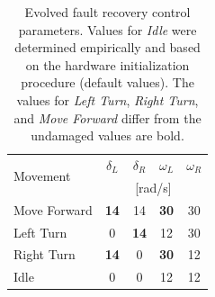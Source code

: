 \begin{table}
\centering
\renewcommand{\arraystretch}{1.7}
\begin{tabular}{l|cccc}
\hline
\multirow{2}{*}{Movement} & $\delta_L$ & $\delta_R$ & $\omega_L$ & $\omega_R$  \\
  & \multicolumn{4}{c}{[rad/s]}\\
\hline
\rowcolor{Gray}
Move Forward & \textbf{14} & 14 & \textbf{30} & 30 \\
Left Turn & 0 & \textbf{14} & 12 & 30 \\
\rowcolor{Gray}
Right Turn & \textbf{14} & 0 & \textbf{30} & 12 \\
Idle & 0 & 0 & 12 & 12 \\
\hline
\end{tabular}
\newline
\caption[Evolved fault recovery control parameters]{Evolved fault recovery control parameters. Values for \textit{Idle} were determined empirically and based on the hardware initialization procedure (default values). The values for \textit{Left Turn}, \textit{Right Turn}, and \textit{Move Forward} differ from the undamaged values are bold.}
\label{tab-ctrl-values-recovered}
\end{table}

